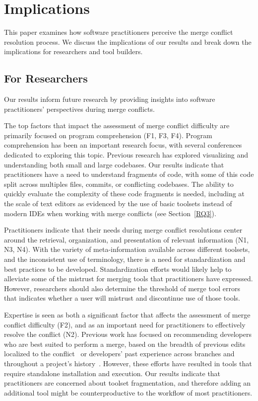 \section{Implications}\label{implications}
This paper examines how software practitioners perceive the merge conflict resolution process.
We discuss the implications of our results and break down the implications for researchers and tool builders.

\subsection{For Researchers}
Our results inform future research by providing insights into software practitioners' perspectives during merge conflicts.

The top factors that impact the assessment of merge conflict difficulty are primarily focused on program comprehension (F1, F3, F4).
Program comprehension has been an important research focus, with several conferences dedicated to exploring this topic.
Previous research has explored visualizing and understanding both small and large codebases.
Our results indicate that practitioners have a need to understand fragments of code, with some of this code split across multiples files, commits, or conflicting codebases.
The ability to quickly evaluate the complexity of these code fragments is needed, including at the scale of text editors as evidenced by the use of basic toolsets instead of modern IDEs when working with merge conflicts (see Section~\ref{RQ3}).

Practitioners indicate that their needs during merge conflict resolutions center around the retrieval, organization, and presentation of relevant information (N1, N3, N4).
With the variety of meta-information available across different toolsets, and the inconsistent use of terminology, there is a need for standardization and best practices to be developed.
Standardization efforts would likely help to alleviate some of the mistrust for merging tools that practitioners have expressed.
However, researchers should also determine the threshold of merge tool errors that indicates whether a user will mistrust and discontinue use of those tools.

Expertise is seen as both a significant factor that affects the assessment of merge conflict difficulty (F2), and as an important need for practitioners to effectively resolve the conflict (N2).
Previous work has focused on recommending developers who are best suited to perform a merge, based on the breadth of previous edits localized to the conflict~\cite{dasilva2015niche} or developers' past experience across branches and throughout a project's history~\cite{CostaSarma}.
However, these efforts have resulted in tools that require standalone installation and execution.
Our results indicate that practitioners are concerned about toolset fragmentation, and therefore adding an additional tool might be counterproductive to the workflow of most practitioners.

